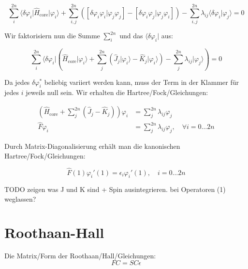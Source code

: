 \begin{equation*}
  \sum_i^{2n} \langle \delta \varphi_i \vert \hat{H}_{\text{core}} \vert \varphi_i \rangle
  + \sum_{i, j}^{2n} \left( 
    \left[ \delta \varphi_i \varphi_i \vert \varphi_j\varphi_j \right] 
    - \left[ \delta \varphi_i\varphi_j \vert \varphi_j\varphi_i \right]
  \right) 
  - \sum_{i,j}^{2n} \lambda_{ij} \langle \delta \varphi_i \vert \varphi_j \rangle
  = 0
\end{equation*}

Wir faktorisiern nun die Summe $\sum_i^{2n}$ und das $\langle \delta \varphi_i \vert$ aus:

\begin{equation*}
  \sum_i^{2n} \langle \delta \varphi_i \vert \left(
    \hat{H}_{\text{core}} \vert \varphi_i \rangle
  + \sum_j^{2n} \left(
    \hat{J}_j \vert \varphi_i \rangle
    - \hat{K}_j \vert \varphi_i \rangle
  \right) 
  - \sum_j^{2n}\lambda_{ij} \vert \varphi_j \rangle \right)
  = 0
\end{equation*}

Da jedes $\delta \varphi_i^*$ beliebig variiert werden kann, muss der Term in der Klammer für jedes $i$ jeweils null sein.
Wir erhalten die Hartree\-/Fock\-/Gleichungen:


\begin{align} \label{uhf}
  \left(\hat{H}_{\text{core}} + \sum_j^{2n} \left( \hat{J}_j - \hat{K}_j \right)\right)\varphi_i &= 
  \sum_j^{2n}\lambda_{ij} \varphi_j \nonumber\\
  \hat{F}\varphi_i &= \sum_j^{2n}\lambda_{ij} \varphi_j, \quad \forall i = 0 \dots 2n
\end{align}

Durch Matrix-Diagonalisierung erhält man die kanonischen Hartree\-/Fock\-/Gleichungen:

\begin{equation} \label{uhf_can}
  \hat{F}(1) \varphi_i'(1) = \epsilon_i \varphi_i'(1), \quad i = 0 \dots 2n
\end{equation}

\cite[S. 253]{atkins_friedman_2011}

TODO zeigen was J und K sind + Spin ausintegrieren. bei Operatoren (1) weglassen?

\section{Roothaan-Hall}
Die Matrix\-/Form der Roothaan\-/Hall\-/Gleichungen:
\begin{equation} \label{roothaan}
  FC = SC\epsilon
\end{equation}


